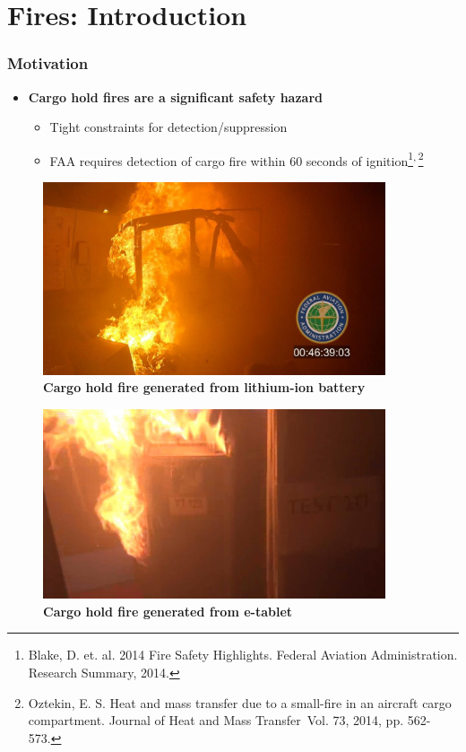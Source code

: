 \documentclass[9pt]{beamer}
\begin{document}
\section{Fires: Introduction}
\label{sec-5}
\begin{frame}
\frametitle{Motivation}
\label{sec-5-1}

\begin{itemize}
\item \textbf{Cargo hold fires are a significant safety hazard}
\begin{itemize}
\item Tight constraints for detection/suppression
\item FAA requires detection of cargo fire within 60 seconds of ignition\footnote{Blake, D. et. al. 2014 Fire Safety Highlights. Federal
Aviation Administration. Research Summary, 2014.
 }\textsuperscript{,}\,\footnote{Oztekin, E. S. Heat and mass transfer due to a small-fire in
an aircraft cargo compartment. \International Journal of Heat and Mass
Transfer\, Vol. 73, 2014, pp. 562-573.
 }
\end{itemize}
\end{itemize}
\centering
\begin{minipage}[b]{0.45\linewidth}
\begin{figure}[ht]
\includegraphics[width=0.9\textwidth]{CargoHoldFire1.png} \\
\textbf{Cargo hold fire generated from lithium-ion battery}
\end{figure}
\end{minipage}
\begin{minipage}[b]{0.45\linewidth}
\begin{figure}[ht]
\includegraphics[width=0.9\textwidth]{CargoHoldFire2.png} \\
\textbf{Cargo hold fire generated from e-tablet}
\end{figure}
\end{minipage}
\end{frame}
\end{document}
